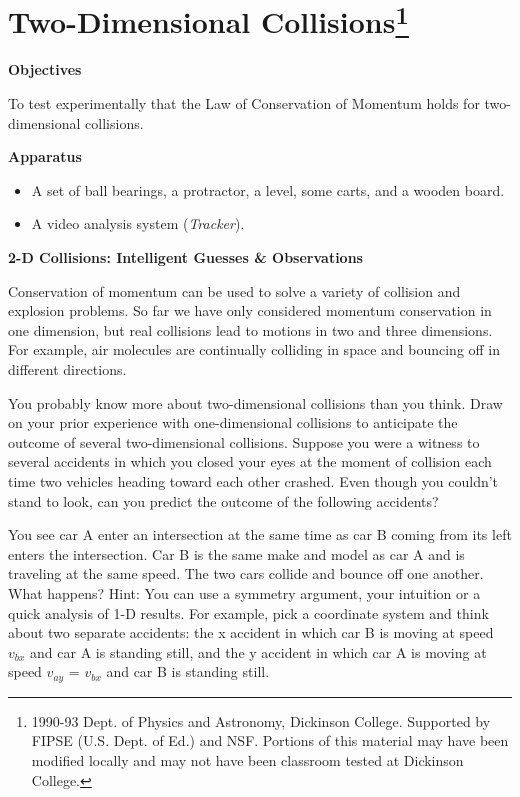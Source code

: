 
\section{Two-Dimensional Collisions\footnote{
1990-93 Dept. of Physics and Astronomy, Dickinson College. Supported by FIPSE
(U.S. Dept. of Ed.) and NSF. Portions of this material may have been modified
locally and may not have been classroom tested at Dickinson College.
}}

\makelabheader %

\bigskip
\textbf{Objectives} 

To test experimentally that the Law of Conservation of Momentum holds for two-dimensional
collisions.

\bigskip
\textbf{Apparatus}

\begin{itemize}[nosep]
\item A set of ball bearings, a protractor, a level, some carts, 
and a wooden board.
\item A video analysis system (\textit{Tracker}).
\end{itemize}

\bigskip
\textbf{2-D Collisions: Intelligent Guesses \& Observations }

Conservation of momentum can be used to solve a variety of collision and explosion
problems. So far we have only considered momentum conservation in one dimension,
but real collisions lead to motions in two and three dimensions. For example,
air molecules are continually colliding in space and bouncing off in different
directions. 

You probably know more about two-dimensional collisions than you think. Draw
on your prior experience with one-dimensional collisions to anticipate the outcome
of several two-dimensional collisions. Suppose you were a witness to several
accidents in which you closed your eyes at the moment of collision each time
two vehicles heading toward each other crashed. Even though you couldn't stand
to look, can you predict the outcome of the following accidents?

You see car A enter an intersection at the same time as car B coming from its
left enters the intersection. Car B is the same make and model as car A and
is traveling at the same speed. The two cars collide and bounce off one another.
What happens? Hint: You can use a symmetry argument, your intuition or a quick
analysis of 1-D results. For example, pick a coordinate system and think about
two separate accidents: the x accident in which car B is moving at speed \( v_{bx} \)
and car A is standing still, and the y accident in which car A is moving at
speed \( v_{ay} \) = \( v_{bx} \) and car B is standing still. 

